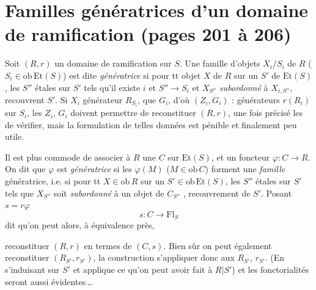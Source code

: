 \documentclass[11pt,a4paper]{article}
\begin{document}
\section*{Familles génératrices d'un domaine de ramification (pages 201 à 206)}



Soit $(R, r)$ un domaine de ramification sur $S$. Une famille d'objets
$X_i/S_i$ de $R$ ($S_i \in \mathrm{ob}\,\mathrm{Et}(S)$) est dite
\emph{génératrice} si pour tt objet $X$ de $R$ sur un $S'$ de
$\mathrm{Et}(S)$, les $S''$ étales sur $S'$ tels qu'il existe $i$ et
$S'' \to S_i$ et \struck{\ill{}} $X_{S''}$ \emph{subordonné} à $X_{i,S''}$,
recouvrent $S'$. Si    \ill{}
$X_i$ \ill{} générateur \ill{} $R_{S_i}$, \struck{\ill{}} que $G_i$, d'où
$(Z_i, G_i)$ \ill{} : générateurs \ill{} $r(R_i)$ sur $S_i$, les $Z_i$, $G_i$
doivent permettre de reconstituer $(R, r)$, une fois précisé les \ill{}
\ill{} de vérifier, mais la formulation de telles données est pénible et
finalement peu utile.


Il est plus commode de \struck{\ill{}} associer à $R$ une   $C$ sur $\mathrm{Et}(S)$, et un foncteur
$\varphi : C \longrightarrow R$. On dit que $\varphi$ est \emph{génératrice}
si les $\varphi(M)$ ($M \in \mathrm{ob}\,C$) forment une \emph{famille}
génératrice, i.e. si pour tt $X \in \mathrm{ob}\,R$ sur un
$S' \in \mathrm{ob}\,\mathrm{Et}(S)$, les $S''$ étales sur $S'$ tels que
$X_{S''}$ soit \emph{subordonné} à un objet de $C_{S''}$
,  recouvrement
de $S'$. Posant $s = r\varphi$
\[
  s : C \longrightarrow \mathrm{Fl}_S
\]
\ill{} dit qu'on peut alors, à équivalence près,


reconstituer $(R, r)$ en termes de $(C, s)$. Bien sûr on peut également
reconstituer $(R_{S'}, r_{S'})$, la construction s'appliquer donc aux
$R_{S'}$, $r_{S'}$. (En s'induisant sur $S'$ et applique ce qu'on peut avoir
\ill{} fait à $R|S'$) et les fonctorialités seront aussi évidentes\,\ldots
\end{document}
